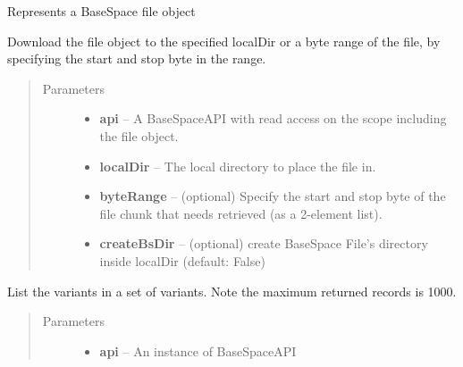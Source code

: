 \documentclass[letterpaper,10pt,english]{sphinxmanual}
\begin{document}
\begin{fulllineitems}
\label{Available modules:BaseSpacePy.model.File.File}
Represents a BaseSpace file object

\begin{fulllineitems}
\label{Available modules:BaseSpacePy.model.File.File.downloadFile}
Download the file object to the specified localDir or a byte range of the file, by specifying the 
start and stop byte in the range.
\begin{quote}\begin{description}
\item[{Parameters}] \leavevmode\begin{itemize}
\item {} 
\textbf{api} -- A BaseSpaceAPI with read access on the scope including the file object.

\item {} 
\textbf{localDir} -- The local directory to place the file in.

\item {} 
\textbf{byteRange} -- (optional) Specify the start and stop byte of the file chunk that needs retrieved (as a 2-element list).

\item {} 
\textbf{createBsDir} -- (optional) create BaseSpace File's directory inside localDir (default: False)

\end{itemize}

\end{description}\end{quote}

\end{fulllineitems}


\begin{fulllineitems}
\label{Available modules:BaseSpacePy.model.File.File.filterVariant}
List the variants in a set of variants. Note the maximum returned records is 1000.
\begin{quote}\begin{description}
\item[{Parameters}] \leavevmode\begin{itemize}
\item {} 
\textbf{api} -- An instance of BaseSpaceAPI


\end{itemize}
\end{description}
\end{quote}
\end{fulllineitems}
\end{fulllineitems}
\end{document}
